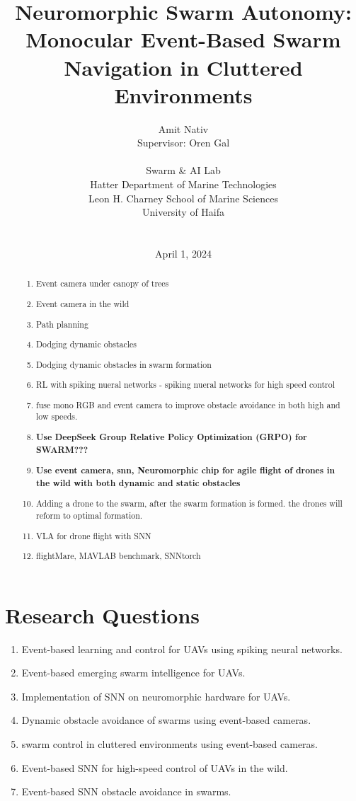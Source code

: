 \documentclass{article}
\title{Neuromorphic Swarm Autonomy: Monocular Event-Based Swarm Navigation in Cluttered Environments}
\author{
    Amit Nativ \\ 
    Supervisor: Oren Gal \\
    \\
    Swarm \& AI Lab \\
    Hatter Department of Marine Technologies \\
    Leon H. Charney School of Marine Sciences \\
    University of Haifa \\
    \\
    \\
    April 1, 2024
}
\begin{document}
\maketitle

\begin{abstract}
\begin{enumerate}
    \item Event camera under canopy of trees
    \item Event camera in the wild
    \item Path planning
    \item Dodging dynamic obstacles
    \item Dodging dynamic obstacles in swarm formation
    \item RL with spiking nueral networks - spiking nueral networks for high speed control
    \item fuse mono RGB and event camera to improve obstacle avoidance in both high and low speeds. 
    \item \textbf{Use DeepSeek Group Relative Policy Optimization (GRPO) for SWARM???} 
    \item \textbf{Use event camera, snn, Neuromorphic chip for agile flight of drones in the wild with both dynamic and static obstacles}
    \item Adding a drone to the swarm, after the swarm formation is formed. the drones will reform to optimal formation.
    \item VLA for drone flight with SNN
    \item flightMare, MAVLAB benchmark, SNNtorch
    
\end{enumerate}
\end{abstract}

\section{Research Questions}
    \begin{enumerate}
        \item Event-based learning and control for UAVs using spiking neural networks.
        \item Event-based emerging swarm intelligence for UAVs.
        \item Implementation of SNN on neuromorphic hardware for UAVs.
        \item Dynamic obstacle avoidance of swarms using event-based cameras.
        \item swarm control in cluttered environments using event-based cameras.
        \item Event-based SNN for high-speed control of UAVs in the wild.
        \item Event-based SNN obstacle avoidance in swarms.
    \end{enumerate}
    
\end{document}
